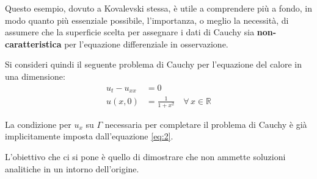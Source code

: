 \begin{example}

Questo esempio, dovuto a Kovalevski stessa, è utile a comprendere più a fondo, in modo quanto più essenziale possibile, l'importanza, o meglio la necessità, di assumere che la superficie scelta per assegnare i dati di Cauchy sia \textbf{non-caratteristica} per l'equazione differenziale in osservazione.
 
Si consideri quindi il seguente problema di Cauchy per l'equazione del calore in una dimensione:
\begin{align} 
\label{eq:1}
u_t-u_{xx}&=0\\ 
\label{eq:2}
u(x,0)&=\frac{1}{1+x^2} \quad \forall \, x \in \mathbb{R}
\end{align}
\begin{remark}
La condizione per $u_x$ su $\Gamma$ necessaria per completare il problema di Cauchy è già implicitamente imposta dall'equazione
\eqref{eq:2}.
\end{remark}
L'obiettivo che ci si pone è quello di dimostrare che non ammette soluzioni analitiche in un intorno dell'origine.


\end{example}

